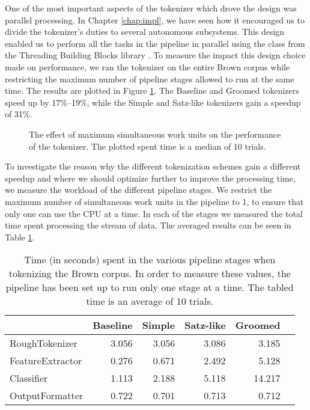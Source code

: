 One of the most important aspects of the tokenizer which drove the design was
parallel processing. In Chapter \ref{chap:impl}, we have seen how it encouraged
us to divide the tokenizer's duties to several autonomous subsystems. This
design enabled us to perform all the tasks in the pipeline in parallel using
the  class from the Threading Building Blocks library
\cite{web-tbb}. To measure the impact this design choice made on performance,
we ran the tokenizer on the entire Brown corpus while restricting the maximum
number of pipeline stages allowed to run at the same time. The results are
plotted in Figure \ref{fig:plot-work-units}. The Baseline and Groomed
tokenizers speed up by 17\%--19\%, while the Simple and Satz-like tokenizers
gain a speedup of 31\%.

\begin{figure}
  \begin{center}
    
    \caption{The effect of maximum simultaneous work units on the performance of
             the tokenizer. The plotted spent time is a median of 10 trials.}
    \label{fig:plot-work-units}
  \end{center}
\end{figure}

To investigate the reason why the different tokenization schemes gain a
different speedup and where we should optimize further to improve the
processing time, we measure the workload of the different pipeline stages. We
restrict the maximum number of simultaneous work units in the pipeline to 1, to
ensure that only one can use the CPU at a time. In each of the stages we
measured the total time spent processing the stream of data. The averaged
results can be seen in Table \ref{tbl:bottlenecks}.

\begin{table}
  \begin{center}
    \begin{tabular}{ | l | r | r | r | r | r | }
      \hline
      & Baseline & Simple & Satz-like & Groomed \\ \hline
      RoughTokenizer & 3.056 & 3.056 & 3.086 & 3.185 \\ \hline
      FeatureExtractor & 0.276 & 0.671 & 2.492 & 5.128 \\ \hline
      Classifier & 1.113 & 2.188 & 5.118 & 14.217 \\ \hline
      OutputFormatter & 0.722 & 0.701 & 0.713 & 0.712 \\
      \hline
    \end{tabular}
  \end{center}
  \caption[Time spent in individual pipeline elements]
    {Time (in seconds) spent in the various pipeline stages when tokenizing the
    Brown corpus. In order to measure these values, the pipeline has been set
    up to run only one stage at a time. The tabled time is an average of 10
    trials.}
  \label{tbl:bottlenecks}
\end{table}

